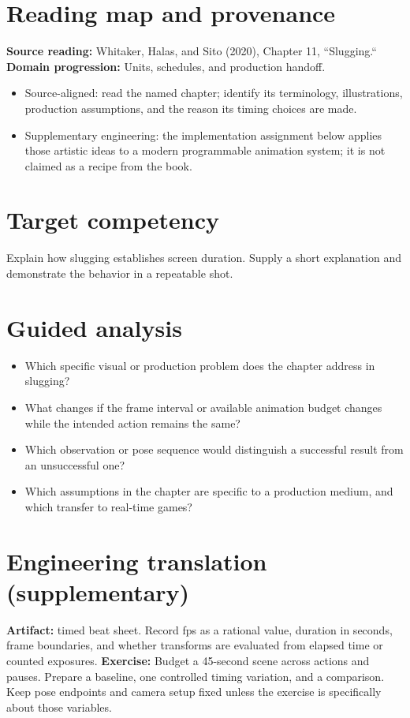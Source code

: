 \documentclass[10pt,letterpaper]{article}
\begin{document}
\makedoctitle
\makedocsummary

\section{Reading map and provenance}
\textbf{Source reading:} Whitaker, Halas, and Sito (2020), Chapter 11, ``Slugging.``\\
\textbf{Domain progression:} Units, schedules, and production handoff.
\begin{itemize}
\item Source-aligned: read the named chapter; identify its terminology, illustrations, production assumptions, and the reason its timing choices are made.
\item Supplementary engineering: the implementation assignment below applies those artistic ideas to a modern programmable animation system; it is not claimed as a recipe from the book.
\end{itemize}
\section{Target competency}
Explain how slugging establishes screen duration. Supply a short explanation and demonstrate the behavior in a repeatable shot.
\section{Guided analysis}
\begin{itemize}
\item Which specific visual or production problem does the chapter address in slugging?
\item What changes if the frame interval or available animation budget changes while the intended action remains the same?
\item Which observation or pose sequence would distinguish a successful result from an unsuccessful one?
\item Which assumptions in the chapter are specific to a production medium, and which transfer to real-time games?
\end{itemize}
\section{Engineering translation (supplementary)}
\textbf{Artifact:} timed beat sheet. Record fps as a rational value, duration in seconds, frame boundaries, and whether transforms are evaluated from elapsed time or counted exposures.
\textbf{Exercise:} Budget a 45-second scene across actions and pauses. Prepare a baseline, one controlled timing variation, and a comparison. Keep pose endpoints and camera setup fixed unless the exercise is specifically about those variables.
\end{document}
